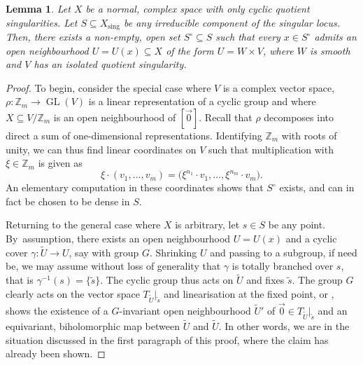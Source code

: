 \documentclass[JEP,XML,SOM,Unicode,published]{cedram}
\theoremstyle{plain}
\newtheorem{lem}[thm]{Lemma}
\theoremstyle{definition}
\numberwithin{equation}{thm}
\numberwithin{enumi}{thm}
\DeclareMathOperator{\sing}{sing}
\DeclareMathOperator{\GL}{GL}
\newcommand{\bZ}{\mathbb{Z}}
\let\wtilde\widetilde
\begin{document}
\begin{lem}\label{lem:glcs}
Let $X$ be a normal, complex space with only cyclic quotient singularities.
Let $S \subseteq X_{\sing}$ be any irreducible component of the singular locus. Then,
there exists a non-empty, open set $S^\circ \subseteq S$ such that every $x \in S^\circ$ admits an
open neighbourhood $U=U(x) \subseteq X$ of the form $U = W \times V$, where $W$ is smooth
and $V$ has an isolated quotient singularity.
\end{lem}
\begin{proof}
To begin, consider the special case where $V$ is a complex vector space,
$\rho : \bZ_m \to \GL(V)$ is a linear representation of a cyclic group and where
$X \subseteq V / \bZ_m$ is an open neighbourhood of $[\vec 0]$. Recall that $\rho$
decomposes into direct a sum of one-dimensional representations. Identifying
$\bZ_m$ with roots of unity, we can thus find linear coordinates on $V$ such
that multiplication with $\xi \in \bZ_m$ is given as
\[
\xi\cdot (v_1, \dots, v_m) = \bigl(\xi^{n_1}\cdot v_1, \dots, \xi^{n_m}\cdot v_m\bigr).
\]
An elementary computation in these coordinates shows that $S^\circ$ exists, and can
in fact be chosen to be dense in $S$.

Returning to the general case where $X$ is arbitrary, let $s \in S$ be any
point. By~assumption, there exists an open neighbourhood $U = U(x)$ and a
cyclic cover $\gamma : \wtilde U \to U$, say with group $G$. Shrinking $U$ and
passing to a subgroup, if need be, we may assume without loss of generality
that $\gamma$ is totally branched over $s$, that is $\gamma^{-1}(s) = \{ \wtilde s \}$.
The cyclic group thus acts on $\wtilde U$ and fixes $\wtilde s$. The group
$G$ clearly acts on the vector space $T_{\wtilde U}|_{\wtilde s}$ and
linearisation at the fixed point, \cite[Proof of Th.\,4]{MR0084174} or
\cite[Cor.\,2 on p.\,13]{MR782881}, shows the existence of a $G$-invariant open
neighbourhood $\wtilde U'$ of $\vec 0 \in T_{\wtilde U}|_{\wtilde s}$ and an
equivariant, biholomorphic map between $\wtilde U$ and $\wtilde U$. In other
words, we are in the situation discussed in the first paragraph of this proof,
where the claim has already been shown.
\end{proof}
\end{document}
